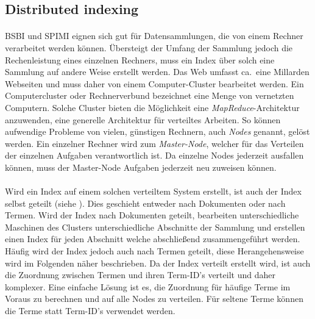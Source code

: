 \subsection{Distributed indexing}
\paragraph{}
BSBI und SPIMI eignen sich gut für Datensammlungen, die von einem Rechner verarbeitet werden können. Übersteigt der Umfang der Sammlung jedoch die Rechenleistung eines einzelnen Rechners, muss ein Index über solch eine Sammlung auf andere Weise erstellt werden. Das Web umfasst ca.\ eine Millarden Webseiten und muss daher von einem Computer-Cluster bearbeitet werden. Ein Computercluster oder Rechnerverbund bezeichnet eine Menge von vernetzten Computern. Solche Cluster bieten die Möglichkeit eine \textit{MapReduce}-Architektur anzuwenden, eine generelle Architektur für verteiltes Arbeiten. So können aufwendige Probleme von vielen, günstigen Rechnern, auch \textit{Nodes} genannt, gelöst werden. Ein einzelner Rechner wird zum \textit{Master-Node}, welcher für das Verteilen der einzelnen Aufgaben verantwortlich ist. Da einzelne Nodes jederzeit ausfallen können, muss der Master-Node Aufgaben jederzeit neu zuweisen können.\par

\paragraph{}
Wird ein Index auf einem solchen verteiltem System erstellt, ist auch der Index selbst geteilt (siehe ). Dies geschieht entweder nach Dokumenten oder nach Termen. Wird der Index nach Dokumenten geteilt, bearbeiten unterschiedliche Maschinen des Clusters unterschiedliche Abschnitte der Sammlung und erstellen einen Index für jeden Abschnitt welche abschließend zusammengeführt werden. Häufig wird der Index jedoch auch nach Termen geteilt, diese Herangehensweise wird im Folgenden näher beschrieben. Da der Index verteilt erstellt wird, ist auch die Zuordnung zwischen Termen und ihren Term-ID's verteilt und daher komplexer. Eine einfache Lösung ist es, die Zuordnung für häufige Terme im Voraus zu berechnen und auf alle Nodes zu verteilen. Für seltene Terme können die Terme statt Term-ID's verwendet werden.\par

